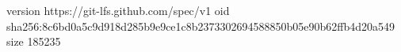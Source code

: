 version https://git-lfs.github.com/spec/v1
oid sha256:8c6bd0a5c9d918d285b9e9ce1c8b2373302694588850b05e90b62ffb4d20a549
size 185235
